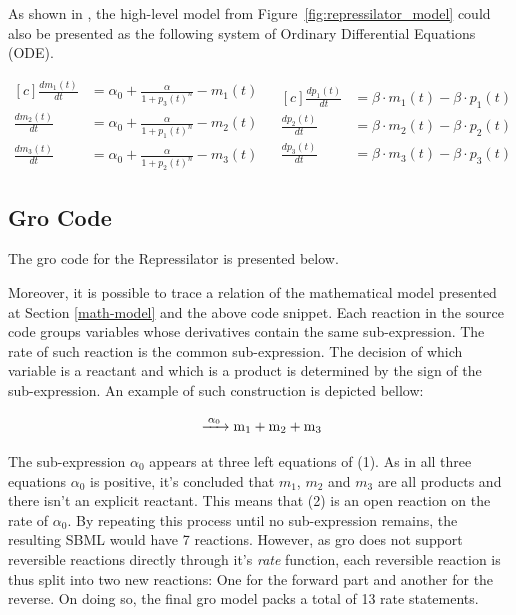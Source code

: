 \documentclass[12pt]{article}
\begin{document}
    As shown in \cite{Elowitz2000}, the high-level model from Figure~\ref{fig:repressilator_model} could also be presented as the following system of Ordinary Differential Equations (ODE).
    
    \begin{equation}
    \begin{aligned}[c]
        \frac{dm_{1}(t)}{dt} & = \alpha_{0} + \frac{\alpha}{1 + p_{3}(t)^{n}} - m_{1}(t) & \\
        \frac{dm_{2}(t)}{dt} & = \alpha_{0} + \frac{\alpha}{1 + p_{1}(t)^{n}} - m_{2}(t) & \\
        \frac{dm_{3}(t)}{dt} & = \alpha_{0} + \frac{\alpha}{1 + p_{2}(t)^{n}} - m_{3}(t) &
    \end{aligned}
    \begin{aligned}[c]
        \frac{dp_{1}(t)}{dt} & = \beta \cdot m_{1}(t) - \beta \cdot p_{1}(t) \\
        \frac{dp_{2}(t)}{dt} & = \beta \cdot m_{2}(t) - \beta \cdot p_{2}(t) \\
        \frac{dp_{3}(t)}{dt} & = \beta \cdot m_{3}(t) - \beta \cdot p_{3}(t)
    \end{aligned}
    \end{equation}

\subsection{Gro Code}

    The gro code for the Repressilator is presented below.
    
    

    Moreover, it is possible to trace a relation of the mathematical model presented at Section \ref{math-model} and the above code snippet. Each reaction in the source code groups variables whose derivatives contain the same sub-expression. The rate of such reaction is the common sub-expression. The decision of which variable is a reactant and which is a product is determined by the sign of the sub-expression. An example of such construction is depicted bellow:
    
    \begin{equation}
    \ce{ ->[\alpha_{0}] m_{1} + m_{2} + m_{3}}
    \end{equation}
    
    The sub-expression $\alpha_{0}$ appears at three left equations of (1). As in all three equations $\alpha_{0}$ is positive, it's concluded that $m_{1}$, $m_{2}$ and $m_{3}$ are all products and there isn't an explicit reactant. This means that (2) is an open reaction on the rate of $\alpha_{0}$. By repeating this process until no sub-expression remains, the resulting SBML would have 7 reactions. However, as gro does not support reversible reactions directly through it's \textit{rate} function, each reversible reaction is thus split into two new reactions: One for the forward part and another for the reverse. On doing so, the final gro model packs a total of 13 rate statements.
\end{document}
